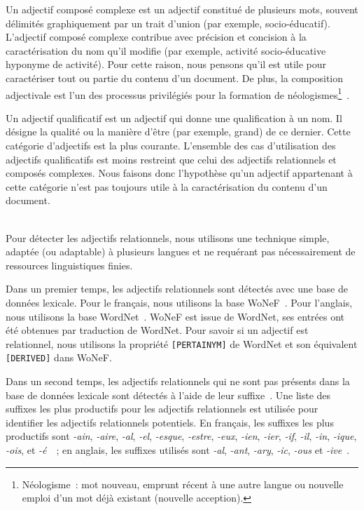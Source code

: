       Un adjectif composé complexe est un adjectif constitué de plusieurs mots,
      souvent délimités graphiquement par un trait d'union (par exemple,
      \og{}socio-éducatif\fg{}). L'adjectif composé complexe contribue avec
      précision et concision à la caractérisation du nom qu'il modifie (par
      exemple, \og{}activité socio-éducative\fg{} hyponyme de
      \og{}activité\fg{}). Pour cette raison, nous pensons qu'il est utile pour
      caractériser tout ou partie du contenu d'un document. De plus, la
      composition adjectivale est l'un des processus privilégiés pour la
      formation de néologismes\footnote{Néologisme~: mot nouveau, emprunt récent
      à une autre langue ou nouvelle emploi d'un mot déjà existant (nouvelle
      acception).}~\cite{boughedaoui1997adjectifscomposes}.

      Un adjectif qualificatif est un adjectif qui donne une qualification à un
      nom. Il désigne la qualité ou la manière d'être (par exemple,
      \og{}grand\fg{}) de ce dernier. Cette catégorie d'adjectifs est la plus
      courante. L'ensemble des cas d'utilisation des adjectifs qualificatifs est
      moins restreint que celui des adjectifs relationnels et composés
      complexes. Nous faisons donc l'hypothèse qu'un adjectif appartenant à
      cette catégorie n'est pas toujours utile à la caractérisation du contenu
      d'un document.
      
      ~\\Pour détecter les adjectifs relationnels, nous utilisons une technique
      simple, adaptée (ou adaptable) à plusieurs langues et ne requérant pas
      nécessairement de ressources linguistiques finies.

      Dans un premier temps, les adjectifs relationnels sont détectés avec une
      base de données lexicale. Pour le français, nous utilisons la base
      WoNeF~\cite{pradet2013wonef}. Pour l'anglais, nous
      utilisons la base  WordNet~\cite{miller1995wordnet}. WoNeF est issue de
      WordNet, ses entrées ont été obtenues par traduction de WordNet. Pour
      savoir si un adjectif est relationnel, nous utilisons la propriété
      \texttt{[PERTAINYM]} de WordNet et son équivalent \texttt{[DERIVED]} dans
      WoNeF.

      Dans un second temps, les adjectifs relationnels qui ne sont pas présents
      dans la base de données lexicale sont détectés à l'aide de leur
      suffixe~\cite{dubois1999derivation}. Une liste des suffixes les plus
      productifs pour les adjectifs relationnels est utilisée pour identifier
      les adjectifs relationnels potentiels. En français, les suffixes les plus
      productifs sont \textit{-ain}, \textit{-aire}, \textit{-al}, \textit{-el},
      \textit{-esque}, \textit{-estre}, \textit{-eux}, \textit{-ien},
      \textit{-ier}, \textit{-if}, \textit{-il}, \textit{-in}, \textit{-ique},
      \textit{-ois}, et
      \textit{-é}~\cite{harastani2013relationaladjectivetranslation}~; en
      anglais, les suffixes utilisés sont \textit{-al}, \textit{-ant},
      \textit{-ary}, \textit{-ic}, \textit{-ous} et
      \textit{-ive}~\cite{grabar2006terminologystructuring}.

